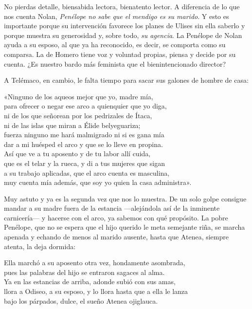No pierdas detalle, biensabida lectora, bienatento lector. A diferencia de lo que nos cuenta Nolan, \emph{Penélope no sabe que el mendigo es su marido}. Y esto es importante porque su intervención favorece los planes de Ulises sin ella saberlo y porque muestra su generosidad y, sobre todo, \emph{su agencia}. La Penélope de Nolan ayuda a su esposo, al que ya ha reconocido, es decir, se comporta como su comparsa. La de Homero tiene voz y voluntad propias, piensa y decide por su cuenta. ¿Es nuestro bardo más feminista que el bienintencionado director?

A Telémaco, en cambio, le falta tiempo para sacar sus galones de hombre de casa:

\begin{versocita}
«Ninguno de los aqueos mejor que yo, madre mía,\\
para ofrecer o negar ese arco a quienquier que yo diga,\\
ni de los que señorean por los pedrizales de Ítaca,\\
ni de las islas que miran a Élide belyeguariza;\\
fuerza ninguno me hará malmigrado ni si es gana mía\\
dar a mi huésped el arco y que se lo lleve en propina.\\
Así que ve a tu aposento y de tu labor allí cuida,\\
que es el telar y la rueca, y di a tus mujeres que sigan\\
a su trabajo aplicadas, que el arco cuenta es masculina,\\
muy cuenta mía además, que soy yo quien la casa administra».
\end{versocita}

Muy astuto y ya es la segunda vez que nos lo muestra. De un solo golpe consigue mandar a su madre fuera de la estancia ---alejándola así de la inminente carnicería--- y hacerse con el arco, ya sabemos con qué propósito. La pobre Penélope, que no se espera que el hijo querido le meta semejante riña, se marcha apenada y echando de menos al marido ausente, hasta que Atenea, siempre atenta, la deja dormida:

\begin{versocita}
Ella marchó a su aposento otra vez, hondamente asombrada,\\
pues las palabras del hijo se entraron sagaces al alma.\\
Ya en las estancias de arriba, adonde subió con sus amas,\\
llora a Odiseo, a su esposo, y lo llora hasta que a ella le lanza\\
bajo los párpados, dulce, el sueño Atenea ojiglauca.
\end{versocita}

